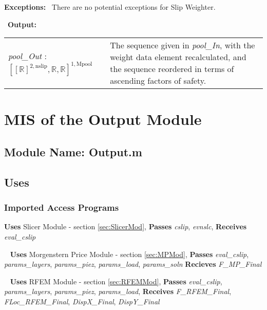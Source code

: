 \documentclass[12pt, titlepage]{article}
\begin{document}
\noindent \textbf{Exceptions:} ~\newline\noindent There are no
potential exceptions for Slip Weighter.

~\newline\noindent \textbf{Output:}
\renewcommand*{\arraystretch}{1.5}
\begin{longtable}{p{} p{}}
  \textit{pool\_Out} : $[[\mathbb{R}]^{2,\text{nslip}}, \mathbb{R},
    \mathbb{R}]^{1,\text{Mpool}}$ & The sequence given in
  \textit{pool\_In}, with the weight data element recalculated, and
  the sequence reordered in terms of ascending factors of safety. \\
\end{longtable}



\section{MIS of the Output
  Module} \label{sec:OutputMod}

\subsection{Module Name: Output.m}

\subsection{Uses}

\subsubsection{Imported Access Programs}
\textbf{Uses} Slicer Module - section \ref{sec:SlicerMod},
\textbf{Passes} \textit{cslip}, \textit{evnslc}, \textbf{Receives}
\textit{eval\_cslip}

~\newline\noindent
\textbf{Uses} Morgenstern Price Module - section \ref{sec:MPMod},
\textbf{Passes} \textit{eval\_cslip}, \textit{params\_layers},
\textit{params\_piez}, \textit{params\_load},
\textit{params\_soln} \textbf{Recieves} \textit{F\_MP\_Final}

~\newline\noindent
\textbf{Uses} RFEM Module - section \ref{sec:RFEMMod},
\textbf{Passes} \textit{eval\_cslip}, \textit{params\_layers},
\textit{params\_piez}, \textit{params\_load},
\textbf{Receives} \textit{F\_RFEM\_Final}, \textit{FLoc\_RFEM\_Final},
\textit{DispX\_Final}, \textit{DispY\_Final}
\end{document}
